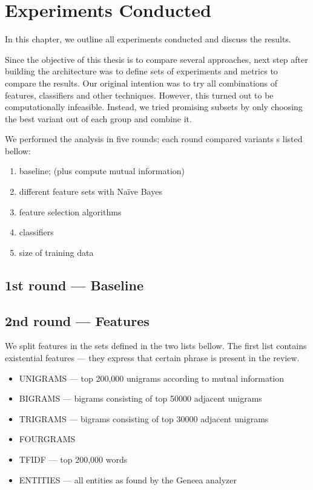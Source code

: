 \chapter{Experiments Conducted}\label{chap:exp}

In this chapter, we outline all experiments conducted and discuss the results.

Since the objective of this thesis is to compare several approaches,
next step after building the architecture was to define sets of experiments and metrics to compare the results.
Our original intention was to try all combinations of features, classifiers and other techniques.
However, this turned out to be computationally infeasible.
Instead, we tried promising subsets by only choosing the best variant out of each group and combine it.

We performed the analysis in five rounds;
each round compared variants s listed bellow:

\begin{enumerate}
	\item baseline; (plus compute mutual information)
	\item different feature sets with Na\"{i}ve Bayes
	\item feature selection algorithms
	\item classifiers
	\item size of training data
\end{enumerate}


\section{1st round --- Baseline}

\section{2nd round --- Features}

We split features in the sets defined in the two lists bellow.
The first list contains existential features --- they express that certain phrase is present in the review.

\begin{itemize}
	\item UNIGRAMS --- top 200,000 unigrams according to mutual information
	\item BIGRAMS --- bigrams consisting of top 50000 adjacent unigrams
	\item TRIGRAMS  --- bigrams consisting of top 30000 adjacent unigrams
	\item FOURGRAMS 
	\item TFIDF  --- top 200,000 words
	\item ENTITIES --- all entities as found by the Geneea analyzer
\end{itemize}

